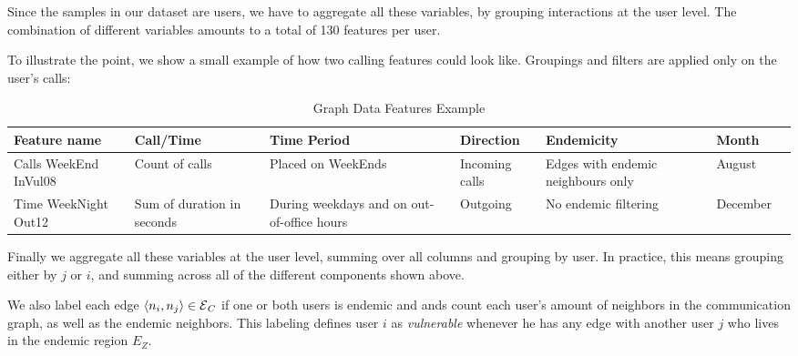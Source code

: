 
Since the samples in our dataset are users, we have to aggregate all these variables, by grouping interactions at the user level. The combination of different variables amounts to a total of 130 features per user.

To illustrate the point, we show a small example of how two calling features could look like. Groupings and filters are applied only on the user's calls:

\begin{table}[ht]
	\caption{Graph Data Features Example}
	\label{tab:data_example}
	\centering
	\begin{tabular} {|p{1.5cm}|p{1.5cm}|p{2cm}|p{1.5cm}|p{2cm}|p{1.5cm}|p{1cm}}
		\toprule
		Feature name & Call/Time & Time Period & Direction & Endemicity & Month\\
		\midrule
		Calls WeekEnd InVul08       & Count of calls & Placed on WeekEnds & Incoming calls & Edges with endemic neighbours only & August\\
		\midrule
		Time WeekNight Out12 & Sum of duration in seconds & During weekdays and on out-of-office hours & Outgoing   & No endemic filtering   & December \\
		
		\bottomrule
	\end{tabular}
\end{table}



Finally we aggregate all these variables at the user level, summing over all columns and grouping by user. 
In practice, this means grouping either by $j$ or $i$, and summing across all of the different components shown above.

We also label each edge $\left< n_i, n_j \right> \in \operatorname{\mathcal{E}}_C$ if one or both users is endemic and
ands count each user's amount of neighbors in the communication graph, as well as the endemic neighbors. This labeling defines user $i$ as \textit{vulnerable} whenever he has any edge with another user $j$ who lives in the endemic region $E_Z$. 



